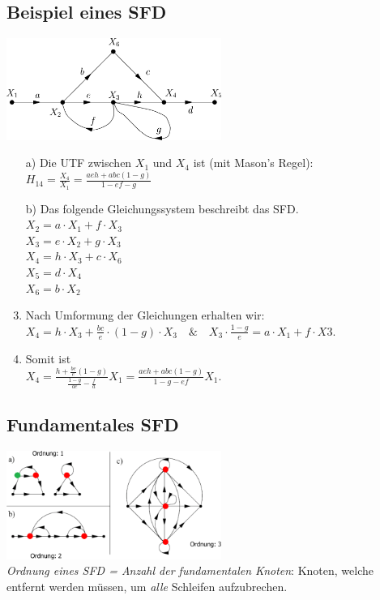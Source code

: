 \begin{minipage}[t]{10cm}
\subsection{Beispiel eines SFD }
	\includegraphics[width=7cm]{./bilder/sfd-bsp.png} 
    \begin{enumerate}
		\item[a)] Die UTF zwischen $X_1$ und $X_4$ ist (mit Mason's Regel):\\
		$H_{14}=\frac{X_4}{X_1}=\frac{aeh+abc(1-g)}{1-ef-g}$
		\item[b)] Das folgende Gleichungssystem beschreibt das SFD.\\
		$X_2 =a\cdot X_1+f\cdot X_3$\\
		$X_3 =e\cdot X_2+g\cdot X_3$\\
		$X_4 =h\cdot X_3+c\cdot X_6$\\
		$X_5 =d\cdot X_4$\\
		$X_6 =b\cdot X_2$
		\item Nach Umformung der Gleichungen erhalten wir: \\
		$X_4=h\cdot X_3+\frac{bc}{e}\cdot (1-g)\cdot X_3\quad\&\quad X_3\cdot
		\frac{1-g}{e}=a\cdot X_1+f\cdot X3.$ 
		\item Somit ist \\ $X_4=\frac{h+\frac{bc}{e}(1-g)}{\frac{1-g}{ae}-\frac{f}{a}}X_1=\frac{aeh+abc(1-g)}{1-g-ef}X_1$.
	\end{enumerate}
	
\subsection{Fundamentales SFD }
	\includegraphics[width=7cm]{./bilder/sfd-ordnung.png} \\
		\textit{Ordnung eines SFD = Anzahl der fundamentalen Knoten}: Knoten, welche
		entfernt werden müssen, um \textit{alle} Schleifen aufzubrechen.
\end{minipage}
